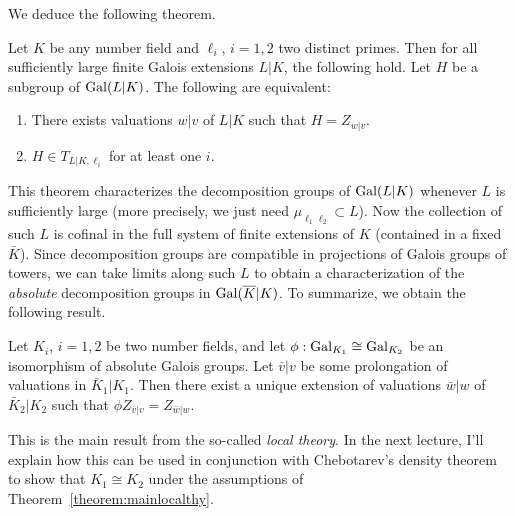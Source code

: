 We deduce the following theorem.
\begin{theorem}
  Let $K$ be any number field and $\ell_{i}$, $i = 1,2$ two distinct primes.
  Then for all sufficiently large finite Galois extensions $L|K$, the following hold.
  Let $H$ be a subgroup of $\operatorname{Gal}(L|K)$.
  The following are equivalent:
  \begin{enumerate}
    \item There exists valuations $w|v$ of $L|K$ such that $H = Z_{w|v}$.
    \item $H \in T_{L|K,\ell_{i}}$ for at least one $i$.
  \end{enumerate}
\end{theorem}

This theorem characterizes the decomposition groups of $\operatorname{Gal}(L|K)$ whenever $L$ is sufficiently large (more precisely, we just need $\mu_{\ell_{1}\ell_{2}} \subset L$).
Now the collection of such $L$ is cofinal in the full system of finite extensions of $K$ (contained in a fixed $\bar K$).
Since decomposition groups are compatible in projections of Galois groups of towers, we can take limits along such $L$ to obtain a characterization of the \emph{absolute} decomposition groups in $\operatorname{Gal}(\overline K|K)$.
To summarize, we obtain the following result.
\begin{theorem}\label{theorem:mainlocalthy}
  Let $K_{i}$, $i = 1,2$ be two number fields, and let $\phi : \operatorname{Gal}_{K_{1}} \cong \operatorname{Gal}_{K_{2}}$ be an isomorphism of absolute Galois groups.
  Let $\bar v|v$ be some prolongation of valuations in $\bar K_{1}|K_{1}$.
  Then there exist a unique extension of valuations $\bar w|w$ of $\bar K_{2}|K_{2}$ such that $\phi Z_{\bar v|v} = Z_{\bar w|w}$.
\end{theorem}

This is the main result from the so-called \emph{local theory}.
In the next lecture, I'll explain how this can be used in conjunction with Chebotarev's density theorem to show that $K_{1}\cong K_{2}$ under the assumptions of Theorem~\ref{theorem:mainlocalthy}.

